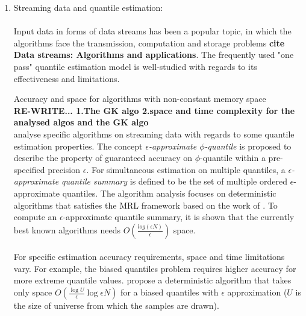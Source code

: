 \documentclass[12pt]{article}
\begin{document}
\begin{enumerate}
    \item Streaming data and quantile estimation: \\\\
    Input data in forms of data streams has been a popular topic, in which the algorithms face the transmission, computation and storage problems \textbf{cite  Data streams: Algorithms and applications}. The frequently used "one pass" quantile estimation model is well-studied with regards to its effectiveness and limitations.

    Accuracy and space for algorithms with non-constant memory space\cite{greenwaldQuantilesEquidepthHistograms2016a}\\
    \textbf{RE-WRITE... 1.The GK algo 2.space and time complexity for the analysed algos and the GK algo} \\
    \citeauthor{greenwaldQuantilesEquidepthHistograms2016a}\cite{greenwaldQuantilesEquidepthHistograms2016a} analyse specific algorithms on streaming data with regards to some quantile estimation properties. The concept \textit{$\epsilon$-approximate $\phi$-quantile} is proposed to describe the property of guaranteed accuracy on $\phi$-quantile within a pre-specified precision $\epsilon$. For simultaneous estimation on multiple quantiles, a \textit{$\epsilon$-approximate quantile summary} is defined to be the set of multiple ordered $\epsilon$-approximate quantiles.
    The algorithm analysis focuses on deterministic algorithms that satisfies the MRL framework based on the work of \citeauthor{mankuApproximateMediansOther} \cite{mankuApproximateMediansOther}. To compute an $\epsilon$-approximate quantile summary, it is shown that the currently best known algorithms needs $O(\frac{log(\epsilon N)} {\epsilon})$ space.
        \\\\
    For specific estimation accuracy requirements, space and time limitations vary. For example, the biased quantiles problem requires higher accuracy for more extreme quantile values. \citeauthor{cormodeSpaceTimeefficientDeterministic2006} \cite{cormodeSpaceTimeefficientDeterministic2006} propose a deterministic algorithm that takes only space $O(\frac{\log {U}}{\epsilon} \log {\epsilon N})$ for a biased quantiles with $\epsilon$ approximation ($U$ is the size of universe from which the samples are drawn). 


\end{enumerate}
\end{document}
